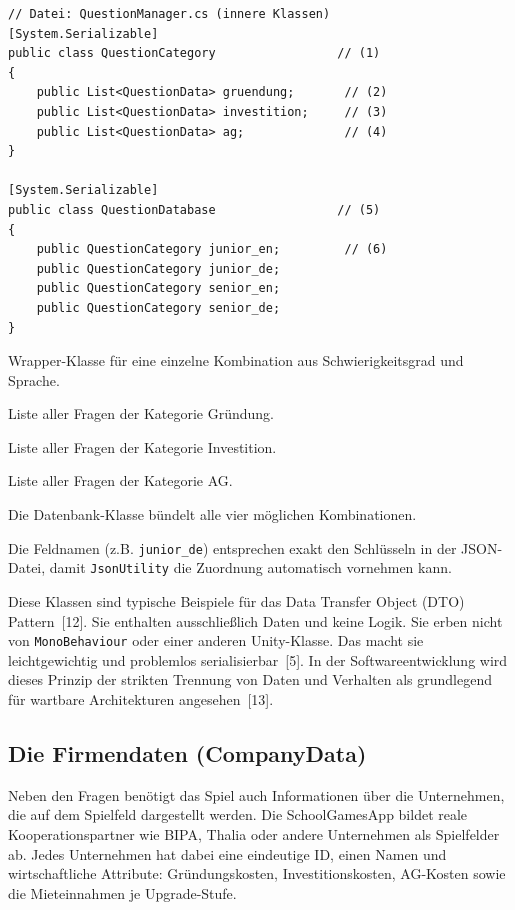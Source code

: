 \documentclass[12pt,a4paper]{article}
\begin{document}
\begin{lstlisting}
// Datei: QuestionManager.cs (innere Klassen)
[System.Serializable]
public class QuestionCategory                 // (1)
{
    public List<QuestionData> gruendung;       // (2)
    public List<QuestionData> investition;     // (3)
    public List<QuestionData> ag;              // (4)
}

[System.Serializable]
public class QuestionDatabase                 // (5)
{
    public QuestionCategory junior_en;         // (6)
    public QuestionCategory junior_de;
    public QuestionCategory senior_en;
    public QuestionCategory senior_de;
}
\end{lstlisting}

\begin{description}[leftmargin=2em, labelwidth=1.5em]
    \item[(1)] Wrapper-Klasse für eine einzelne Kombination aus Schwierigkeitsgrad und Sprache.
    \item[(2)] Liste aller Fragen der Kategorie Gründung.
    \item[(3)] Liste aller Fragen der Kategorie Investition.
    \item[(4)] Liste aller Fragen der Kategorie AG.
    \item[(5)] Die Datenbank-Klasse bündelt alle vier möglichen Kombinationen.
    \item[(6)] Die Feldnamen (z.B. \texttt{junior\_de}) entsprechen exakt den Schlüsseln in der JSON-Datei, damit \texttt{JsonUtility} die Zuordnung automatisch vornehmen kann.
\end{description}

Diese Klassen sind typische Beispiele für das Data Transfer Object (DTO) Pattern~[12]. Sie enthalten ausschließlich Daten und keine Logik. Sie erben nicht von \texttt{MonoBehaviour} oder einer anderen Unity-Klasse. Das macht sie leichtgewichtig und problemlos serialisierbar~[5]. In der Softwareentwicklung wird dieses Prinzip der strikten Trennung von Daten und Verhalten als grundlegend für wartbare Architekturen angesehen~[13].

\subsection{Die Firmendaten (CompanyData)}

Neben den Fragen benötigt das Spiel auch Informationen über die Unternehmen, die auf dem Spielfeld dargestellt werden. Die SchoolGamesApp bildet reale Kooperationspartner wie BIPA, Thalia oder andere Unternehmen als Spielfelder ab. Jedes Unternehmen hat dabei eine eindeutige ID, einen Namen und wirtschaftliche Attribute: Gründungskosten, Investitionskosten, AG-Kosten sowie die Mieteinnahmen je Upgrade-Stufe.
\end{document}
